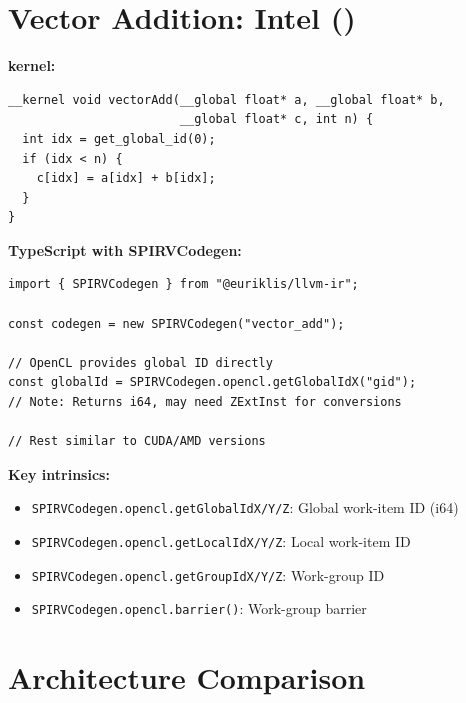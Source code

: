 \section{Vector Addition: Intel  ()}

\textbf{ kernel:}
\begin{lstlisting}[style=ir]
__kernel void vectorAdd(__global float* a, __global float* b,
                        __global float* c, int n) {
  int idx = get_global_id(0);
  if (idx < n) {
    c[idx] = a[idx] + b[idx];
  }
}
\end{lstlisting}

\textbf{TypeScript with SPIRVCodegen:}
\begin{lstlisting}[style=ts]
import { SPIRVCodegen } from "@euriklis/llvm-ir";

const codegen = new SPIRVCodegen("vector_add");

// OpenCL provides global ID directly
const globalId = SPIRVCodegen.opencl.getGlobalIdX("gid");
// Note: Returns i64, may need ZExtInst for conversions

// Rest similar to CUDA/AMD versions
\end{lstlisting}

\textbf{Key  intrinsics:}
\begin{itemize}[noitemsep]
  \item \texttt{SPIRVCodegen.opencl.getGlobalIdX/Y/Z}: Global work-item ID (i64)
  \item \texttt{SPIRVCodegen.opencl.getLocalIdX/Y/Z}: Local work-item ID
  \item \texttt{SPIRVCodegen.opencl.getGroupIdX/Y/Z}: Work-group ID
  \item \texttt{SPIRVCodegen.opencl.barrier()}: Work-group barrier
\end{itemize}

\section{ Architecture Comparison}

